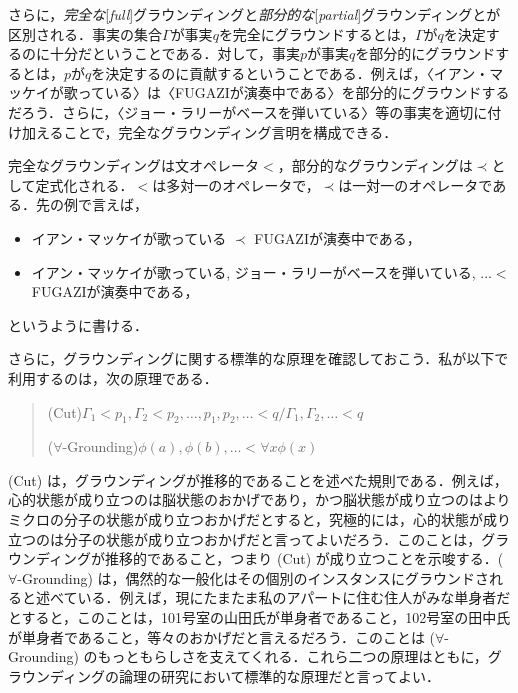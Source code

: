 \documentclass[dvipdfmx,twoside,11pt,uplatex]{jsarticle}
\newcommand{\myterm}[2]{{\emph{#1}}{[\emph{#2}]}}
\theoremstyle{definition}
\begin{document}
さらに，\myterm{完全な}{full}グラウンディングと\myterm{部分的な}{partial}グラウンディングとが区別される\citep{fine2012guide}．事実の集合$\Gamma$が事実$q$を完全にグラウンドするとは，$\Gamma$が$q$を決定するのに十分だということである．対して，事実$p$が事実$q$を部分的にグラウンドするとは，$p$が$q$を決定するのに貢献するということである．例えば，〈イアン・マッケイが歌っている〉は〈FUGAZIが演奏中である〉を部分的にグラウンドするだろう．さらに，〈ジョー・ラリーがベースを弾いている〉等の事実を適切に付け加えることで，完全なグラウンディング言明を構成できる．

完全なグラウンディングは文オペレータ$<$，部分的なグラウンディングは$\prec$として定式化される\cite{fine2012guide}．$<$は多対一のオペレータで，$\prec$は一対一のオペレータである．先の例で言えば，
\begin{itemize}
    \item イアン・マッケイが歌っている $\prec$ FUGAZIが演奏中である，
    \item イアン・マッケイが歌っている, ジョー・ラリーがベースを弾いている, $\ldots <$ FUGAZIが演奏中である，
\end{itemize}
というように書ける．

さらに，グラウンディングに関する標準的な原理を確認しておこう．私が以下で利用するのは，次の原理である．
\begin{quote}
    (Cut)\quad $\Gamma_1 < p_1, \Gamma_2 < p_2, \ldots , p_1, p_2,\ldots < q / \Gamma_1, \Gamma_2, \ldots < q$

    ($\forall$-Grounding)\quad $\phi(a), \phi(b), \ldots < \forall x \phi(x)$

\end{quote}
(Cut) は，グラウンディングが推移的であることを述べた規則である．例えば，心的状態が成り立つのは脳状態のおかげであり，かつ脳状態が成り立つのはよりミクロの分子の状態が成り立つおかげだとすると，究極的には，心的状態が成り立つのは分子の状態が成り立つおかげだと言ってよいだろう．このことは，グラウンディングが推移的であること，つまり (Cut) が成り立つことを示唆する．($\forall$-Grounding) は，偶然的な一般化はその個別のインスタンスにグラウンドされると述べている．例えば，現にたまたま私のアパートに住む住人がみな単身者だとすると，このことは，101号室の山田氏が単身者であること，102号室の田中氏が単身者であること，等々のおかげだと言えるだろう．このことは ($\forall$-Grounding) のもっともらしさを支えてくれる．これら二つの原理はともに，グラウンディングの論理の研究において標準的な原理だと言ってよい\citep[see][]{fine2012guide}．
\end{document}
